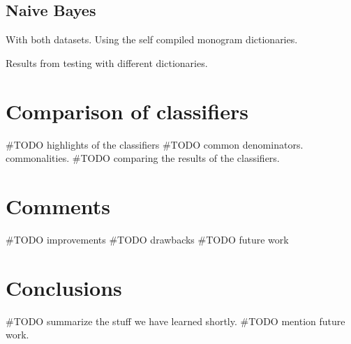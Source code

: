 \subsection{Naive Bayes}
With both datasets.
Using the self compiled monogram dictionaries. 

Results from testing with different dictionaries. 

\section{Comparison of classifiers}
#TODO highlights of the classifiers
#TODO common denominators. commonalities.   
#TODO comparing the results of the classifiers.  

\section{Comments}
#TODO improvements
#TODO drawbacks
#TODO future work

\section{Conclusions}
#TODO summarize the stuff we have learned shortly. 
#TODO mention future work. 
